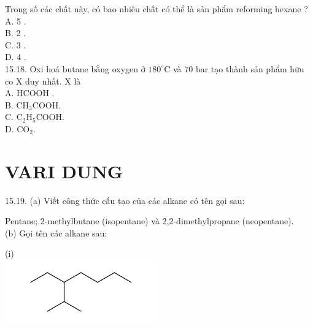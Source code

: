 \documentclass[10pt]{article}
\begin{document}
Trong số các chất này, có bao nhiêu chất có thể là sản phẩm reforming hexane ?\\
A. 5 .\\
B. 2 .\\
C. 3 .\\
D. 4 .\\
15.18. Oxi hoá butane bằng oxygen ở $180^{\circ} \mathrm{C}$ và 70 bar tạo thành sản phẩm hữu co X duy nhất. X là\\
A. HCOOH .\\
B. $\mathrm{CH}_{3} \mathrm{COOH}$.\\
C. $\mathrm{C}_{2} \mathrm{H}_{5} \mathrm{COOH}$.\\
D. $\mathrm{CO}_{2}$.

\section*{VARI DUNG}
15.19. (a) Viết công thức cấu tạo của các alkane có tên gọi sau:

Pentane; 2-methylbutane (isopentane) và 2,2-dimethylpropane (neopentane).\\
(b) Gọi tên các alkane sau:

(i)\\
\includegraphics{smile-07f6b3b30c07a4b191c70636720818c1c00be6ec}
\end{document}
